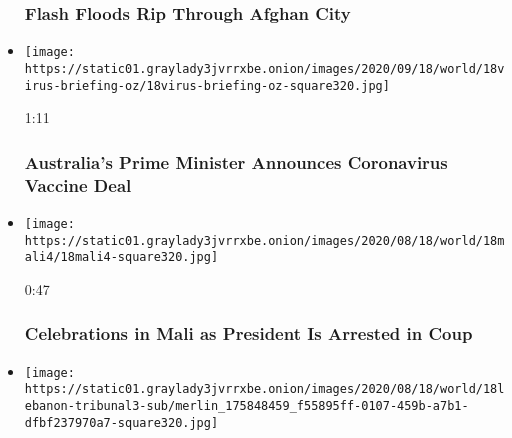 \begin{itemize}
  \hypertarget{flash-floods-rip-through-afghan-city}{%
  \subsubsection{Flash Floods Rip Through Afghan
  City}\label{flash-floods-rip-through-afghan-city}}
\item
  \href{https://www.nytimes3xbfgragh.onion/video/us/politics/100000007296394/australia-coronavirus-vaccine.html?action=click\&module=video-series-bar\&region=header\&pgtype=Article\&playlistId=video/world}{}

  \texttt{[image: https://static01.graylady3jvrrxbe.onion/images/2020/09/18/world/18virus-briefing-oz/18virus-briefing-oz-square320.jpg]}

  1:11

  \hypertarget{australias-prime-minister-announces-coronavirus-vaccine-deal}{%
  \subsubsection{Australia's Prime Minister Announces Coronavirus
  Vaccine
  Deal}\label{australias-prime-minister-announces-coronavirus-vaccine-deal}}
\item
  \href{https://www.nytimes3xbfgragh.onion/video/world/africa/100000007295438/mali-coup-keita.html?action=click\&module=video-series-bar\&region=header\&pgtype=Article\&playlistId=video/world}{}

  \texttt{[image: https://static01.graylady3jvrrxbe.onion/images/2020/08/18/world/18mali4/18mali4-square320.jpg]}

  0:47

  \hypertarget{celebrations-in-mali-as-president-is-arrested-in-coup}{%
  \subsubsection{Celebrations in Mali as President Is Arrested in
  Coup}\label{celebrations-in-mali-as-president-is-arrested-in-coup}}
\item
  \href{https://www.nytimes3xbfgragh.onion/video/us/politics/100000007294649/hezbollah-member-guilty-hariri-assassination.html?action=click\&module=video-series-bar\&region=header\&pgtype=Article\&playlistId=video/world}{}

  \texttt{[image: https://static01.graylady3jvrrxbe.onion/images/2020/08/18/world/18lebanon-tribunal3-sub/merlin\_175848459\_f55895ff-0107-459b-a7b1-dfbf237970a7-square320.jpg]}


\end{itemize}
